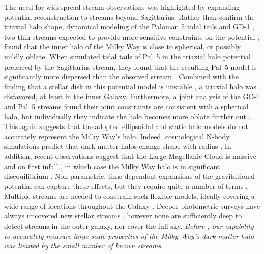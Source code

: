 \documentclass[final,5p,times,twocolumn,authoryear]{elsarticle}
\begin{document}
The need for widespread stream observations was highlighted by expanding potential reconstruction to streams beyond Sagittarius.
Rather than confirm the triaxial halo shape, dynamical modeling of the Palomar~5 tidal tails \citep[Pal~5;][]{kupper:2015} and GD-1 \citep{koposov:2010}, two thin streams expected to provide more sensitive constraints on the potential \citep{lux:2013}, found that the inner halo of the Milky Way is close to spherical, or possibly mildly oblate.
When \citet{pearson:2015} simulated tidal tails of Pal~5 in the triaxial halo potential preferred by the Sagittarius stream, they found that the resulting Pal~5 model is significantly more dispersed than the observed stream \citep{odenkirchen:2001, rockosi:2002}.
Combined with the finding that a stellar disk in this potential model is unstable \citep{debattista:2013}, a triaxial halo was disfavored, at least in the inner Galaxy.
Furthermore, a joint analysis of the GD-1 and Pal~5 streams found their joint constraints are consistent with a spherical halo, but individually they indicate the halo becomes more oblate further out \citep{bovy:2016}.
This again suggests that the adopted ellipsoidal and static halo models do not accurately represent the Milky Way's halo.
Indeed, cosmological N-body simulations predict that dark matter halos change shape with radius \citep[e.g.,][]{allgood:2006, bett:2007, maccio:2007, peter:2013, chua:2019}.
In addition, recent observations suggest that the Large Magellanic Cloud is massive and on first infall \citep[e.g.,][]{kallivayalil:2006, kallivayalil:2013, besla:2007, penarrubia:2016}, in which case the Milky Way halo is in significant disequilibrium \citep[e.g.,][]{bekki:2012, gomez:2015, garavito-camargo:2019}.
Non-parametric, time-dependent expansions of the gravitational potential can capture these effects, but they require quite a number of terms \citep[e.g.,][]{lowing:2011, lilley:2018, garavito-camargo:2021}.
Multiple streams are needed to constrain such flexible models, ideally covering a wide range of locations throughout the Galaxy \citep[e.g.,][]{bh:2018}.
Deeper photometric surveys have always uncovered new stellar streams \citep[e.g.,][]{koposov:2014, martin:2014, shipp:2018, jethwa:2018}, however none are sufficiently deep to detect streams in the outer galaxy, nor cover the full sky.
\emph{Before \gaia, our capability to accurately measure large-scale properties of the Milky Way's dark matter halo was limited by the small number of known streams.}
\end{document}
